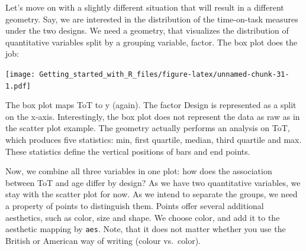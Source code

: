 \documentclass[]{svmono}
\newenvironment{Shaded}{\begin{snugshade}}{\end{snugshade}}
\newcommand{\KeywordTok}[1]{\textcolor[rgb]{0.13,0.29,0.53}{\textbf{#1}}}
\newcommand{\DataTypeTok}[1]{\textcolor[rgb]{0.13,0.29,0.53}{#1}}
\newcommand{\StringTok}[1]{\textcolor[rgb]{0.31,0.60,0.02}{#1}}
\newcommand{\OperatorTok}[1]{\textcolor[rgb]{0.81,0.36,0.00}{\textbf{#1}}}
\newcommand{\NormalTok}[1]{#1}
\theoremstyle{definition}
\theoremstyle{definition}
\theoremstyle{definition}
\theoremstyle{remark}
\begin{document}
Let's move on with a slightly different situation that will result in a
different geometry. Say, we are interested in the distribution of the
time-on-task measures under the two designs. We need a geometry, that
visualizes the distribution of quantitative variables split by a
grouping variable, factor. The box plot does the job:

\begin{Shaded}
\end{Shaded}

\texttt{[image: Getting\_started\_with\_R\_files/figure-latex/unnamed-chunk-31-1.pdf]}

The box plot maps ToT to y (again). The factor Design is represented as
a split on the x-axis. Interestingly, the box plot does not represent
the data as raw as in the scatter plot example. The geometry actually
performs an analysis on ToT, which produces five statistics: min, first
quartile, median, third quartile and max. These statistics define the
vertical positions of bars and end points.

Now, we combine all three variables in one plot: how does the
association between ToT and age differ by design? As we have two
quantitative variables, we stay with the scatter plot for now. As we
intend to separate the groups, we need a property of points to
distinguish them. Points offer several additional aesthetics, such as
color, size and shape. We choose color, and add it to the aesthetic
mapping by \texttt{aes}. Note, that it does not matter whether you use
the British or American way of writing (colour vs.~color).

\begin{Shaded}
\end{Shaded}
\end{document}
